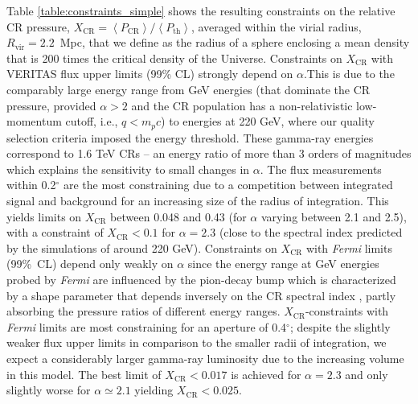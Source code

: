 \documentclass[12pt,manuscript]{aastex}
\def\Fermi{{\em Fermi}\xspace}
\newcommand{\expval}[1]{\left\langle #1 \right\rangle}
\newcommand{\rmn}{\mathrm}
\newcommand{\CR}{\mathrm{CR}}
\begin{document}
Table \ref{table:constraints_simple} shows the resulting constraints on the relative CR pressure,
$X_{\CR} = \expval{P_{\CR}}/\expval{P_\rmn{th}}$, averaged within the virial radius,
$R_\rmn{vir}=2.2$~Mpc, that we define as the radius of a sphere enclosing a mean density that is 200
times the critical density of the Universe. Constraints on $X_\CR$ with VERITAS flux upper limits
(99\% CL) strongly depend on $\alpha$.This is due to the comparably large energy range from
GeV energies (that dominate the CR pressure, provided $\alpha>2$ and the CR population has a
non-relativistic low-momentum cutoff, i.e., $q<m_p c$) to energies at 220 GeV, where our quality
selection criteria imposed the energy threshold. These gamma-ray energies correspond to 1.6 TeV
CRs -- an energy ratio of more than 3 orders of magnitudes which explains the sensitivity to small
changes in $\alpha$. The flux measurements within 0.2$^{\circ}$ are the most constraining due to
a competition between integrated signal and background for an increasing size of the radius of
integration. This yields limits on $X_\CR$ between 0.048 and 0.43 (for $\alpha$ varying between 2.1
and 2.5), with a constraint of $X_\CR<0.1$ for $\alpha=2.3$ (close to the spectral index predicted
by the simulations of \citet{article:PinzkePfrommer:2010} around 220 GeV). Constraints on $X_\CR$
with \Fermi limits (99\%\ CL) depend only weakly on $\alpha$ since the energy range at GeV
energies probed by \Fermi are influenced by the pion-decay bump which is characterized by a shape
parameter that depends inversely on the CR spectral index \citep{article:PfrommerEnsslin:2004b},
partly absorbing the pressure ratios of different energy ranges. $X_\CR$-constraints with \Fermi
limits are most constraining for an aperture of 0.4$^{\circ}$; despite the slightly weaker flux
upper limits in comparison to the smaller radii of integration, we expect a considerably larger
gamma-ray luminosity due to the increasing volume in this model. The best limit of $X_\CR< 0.017$
is achieved for $\alpha=2.3$ and only slightly worse for $\alpha\simeq 2.1$ yielding $X_\CR<0.025$.

%
%
\end{document}
